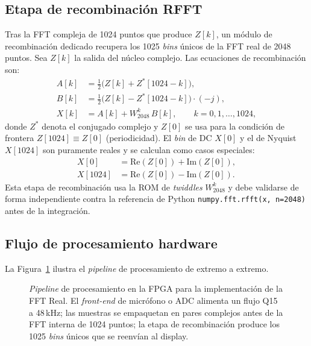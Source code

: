 \documentclass[11pt,a4paper]{article}
\begin{document}
\subsection{Etapa de recombinación RFFT}
\label{sec:recomb}
Tras la FFT compleja de 1024 puntos que produce $Z[k]$, un módulo de
recombinación dedicado recupera los 1025 \emph{bins} únicos de la FFT real de
2048 puntos. Sea $Z[k]$ la salida del núcleo complejo. Las ecuaciones de
recombinación son:
\begin{align}
  A[k] &= \tfrac{1}{2}\bigl(Z[k] + Z^{*}[1024-k]\bigr), \\
  B[k] &= \tfrac{1}{2}\bigl(Z[k] - Z^{*}[1024-k]\bigr)\cdot(-j), \\
  X[k] &= A[k] + W_{2048}^{k}\,B[k], \qquad k = 0,1,\dots,1024,
\end{align}
donde $Z^{*}$ denota el conjugado complejo y $Z[0]$ se usa para la condición de
frontera $Z[1024]\equiv Z[0]$ (periodicidad). El \emph{bin} de DC $X[0]$ y el de
Nyquist $X[1024]$ son puramente reales y se calculan como casos especiales:
\begin{align}
  X[0]    &= \mathrm{Re}(Z[0]) + \mathrm{Im}(Z[0]), \\
  X[1024] &= \mathrm{Re}(Z[0]) - \mathrm{Im}(Z[0]).
\end{align}
Esta etapa de recombinación usa la ROM de \emph{twiddles} $W_{2048}^{k}$ y debe
validarse de forma independiente contra la referencia de Python
\texttt{numpy.fft.rfft(x, n=2048)} antes de la integración.

\subsection{Flujo de procesamiento hardware}
La Figura~\ref{fig:pipeline} ilustra el \emph{pipeline} de procesamiento de
extremo a extremo.

\begin{figure}[H]
\centering
{}
\caption{\emph{Pipeline} de procesamiento en la FPGA para la implementación de
la FFT Real. El \emph{front-end} de micrófono o ADC alimenta un flujo Q15 a
48\,kHz; las muestras se empaquetan en pares complejos antes de la FFT interna
de 1024 puntos; la etapa de recombinación produce los 1025 \emph{bins} únicos
que se reenvían al display.}
\label{fig:pipeline}
\end{figure}
\end{document}
